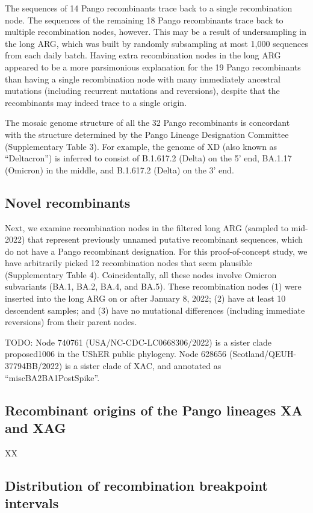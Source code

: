 \documentclass{article}
\begin{document}
The sequences of 14 Pango recombinants trace back to a single recombination node. The sequences of the remaining 18 Pango recombinants trace back to multiple recombination nodes, however. This may be a result of undersampling in the long ARG, which was built by randomly subsampling at most 1,000 sequences from each daily batch. Having extra recombination nodes in the long ARG appeared to be a more parsimonious explanation for the 19 Pango recombinants than having a single recombination node with many immediately ancestral mutations (including recurrent mutations and reversions), despite that the recombinants may indeed trace to a single origin.

The mosaic genome structure of all the 32 Pango recombinants is concordant with the structure determined by the Pango Lineage Designation Committee (Supplementary Table 3). For example, the genome of XD (also known as “Deltacron”) is inferred to consist of B.1.617.2 (Delta) on the 5’ end, BA.1.17 (Omicron) in the middle, and B.1.617.2 (Delta) on the 3’ end.

\subsection{Novel recombinants}

Next, we examine recombination nodes in the filtered long ARG (sampled to mid-2022) that represent previously unnamed putative recombinant sequences, which do not have a Pango recombinant designation. For this proof-of-concept study, we have arbitrarily picked 12 recombination nodes that seem plausible (Supplementary Table 4). Coincidentally, all these nodes involve Omicron subvariants (BA.1, BA.2, BA.4, and BA.5). These recombination nodes (1) were inserted into the long ARG on or after January 8, 2022; (2) have at least 10 descendent samples; and (3) have no mutational differences (including immediate reversions) from their parent nodes.

TODO: Node  740761 (USA/NC-CDC-LC0668306/2022) is a sister clade proposed1006 in the UShER public phylogeny.
Node 628656 (Scotland/QEUH-37794BB/2022) is a sister clade of XAC, and annotated as “miscBA2BA1PostSpike”.

\subsection{Recombinant origins of the Pango lineages XA and XAG}

XX

\subsection{Distribution of recombination breakpoint intervals}
\end{document}
